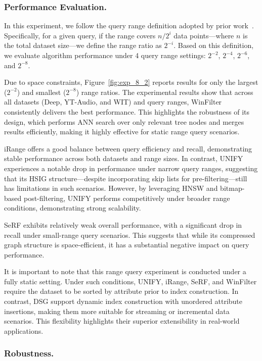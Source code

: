 \documentclass[sigconf, nonacm]{acmart}
\begin{document}
\subsubsection{Performance Evaluation. }

In this experiment, we follow the query range definition adopted by prior work~\cite{HQI}. Specifically, for a given query, if the range covers $n/2^i$ data points—where $n$ is the total dataset size—we define the range ratio as $2^{-i}$. Based on this definition, we evaluate algorithm performance under 4 query range settings: $2^{-2}$, $2^{-4}$, $2^{-6}$, and $2^{-8}$.

Due to space constraints, Figure~\ref{fig:exp_8_2} reports results for only the largest ($2^{-2}$) and smallest ($2^{-8}$) range ratios. The experimental results show that across all datasets (Deep, YT-Audio, and WIT) and query ranges, WinFilter consistently delivers the best performance. This highlights the robustness of its design, which performs ANN search over only relevant tree nodes and merges results efficiently, making it highly effective for static range query scenarios.

iRange offers a good balance between query efficiency and recall, demonstrating stable performance across both datasets and range sizes. In contrast, UNIFY experiences a notable drop in performance under narrow query ranges, suggesting that its HSIG structure—despite incorporating skip lists for pre-filtering—still has limitations in such scenarios. However, by leveraging HNSW and bitmap-based post-filtering, UNIFY performs competitively under broader range conditions, demonstrating strong scalability.

SeRF exhibits relatively weak overall performance, with a significant drop in recall under small-range query scenarios. This suggests that while its compressed graph structure is space-efficient, it has a substantial negative impact on query performance.

It is important to note that this range query experiment is conducted under a fully static setting. Under such conditions, UNIFY, iRange, SeRF, and WinFilter require the dataset to be sorted by attribute prior to index construction. In contrast, DSG  support dynamic index construction with unordered attribute insertions, making them more suitable for streaming or incremental data scenarios. This flexibility highlights their superior extensibility in real-world applications.
\subsubsection{Robustness.}
\end{document}
